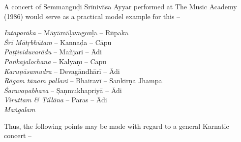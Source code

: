 A concert of Semmanguḍi Srīnivāsa Ayyar performed at The Music Academy (1986) would serve as a practical model example for this –

\textit{Intaparāka} – Māyāmāḷavagouḷa – Rūpaka\\ \textit{Śrī Mātṛbhūtam} – Kannaḍa – Cāpu\\ \textit{Paṭṭividuvarādu} – Mañjari – Ādi\\ \textit{Paṅkajalochana} – Kalyāṇī – Cāpu\\ \textit{Karuṇāsamudra} – Devagāndhārī – Ādi\\ \textit{Rāgam tānam pallavi} – Bhairavī – Sankīrṇa Jhampa\\ \textit{Śaravaṇabhava} – Ṣaṇmukhapriyā – Ādi\\ \textit{Viruttam \& Tillāna} – Paras – Ādi \\ \textit{Maṅgalam}

Thus, the following points may be made with regard to a general Karnatic concert –

